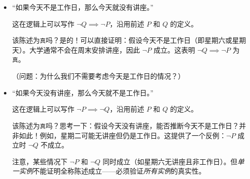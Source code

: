 \begin{example}
\begin{itemize}
        \item ``如果今天不是工作日，那么今天就没有讲座。''
        
            这在逻辑上可以写作 $\neg Q \implies \neg P$，沿用前述 $P$ 和 $Q$ 的定义。

            该陈述为\verb|真|吗？是的！可以直接证明：假设今天不是工作日（即星期六或星期天）。大学通常不会在周末安排讲座，因此 $\neg P$ 成立。这表明 $\neg Q \implies \neg P$ 为\verb|真|。

            （问题：为什么我们不需要考虑今天是工作日的情况？）

        \item ``如果今天没有讲座，那么今天就不是工作日。''
        
            这在逻辑上可以写作 $\neg P \implies \neg Q$，沿用前述 $P$ 和 $Q$ 的定义。

            该陈述为\verb|真|吗？思考一下：假设今天没有讲座，能否推断今天不是工作日？并非如此！例如，星期二可能无讲座但仍是工作日。这提供了一个反例：$\neg P$ 成立时 $\neg Q$ 不成立。

            注意，某些情况下 $\neg P$ 和 $\neg Q$ 同时成立（如星期六无讲座且非工作日）。但\emph{单一实例}不能证明全称陈述成立——必须验证\emph{所有实例}的真实性。
    \end{itemize}
\end{example}

